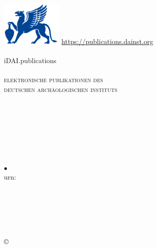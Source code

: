 \documentclass[fontsize=9pt,english,ngerman]{scrartcl}
\def\issnonlinetag{\issntagonline \mysep \eng{\issntagonline} \mybf{\issnonline}\\}
\begin{document}
\begin{flushright}
\includegraphics[width=3cm]{dailogo}\hspace*{1.9cm}%
{\tiny\href{https://publications.dainst.org}{https://publications.dainst.org}}\\[-.2em]
\myrule\\[.5em]
{\fontsize{30}{10}\selectfont iDAI.publications}\\
\myrule\\[.5em]
{\scshape elektronische publikationen des\\ deutschen archäologischen instituts}
\end{flushright}
\RaggedRight
\vspace*{4em}
\entry{\digitaloffprint}{}\\[1em]
{\huge\artauthor\\[.5em]
\mybf{\arttitle}}{}\\[6em]

\entry{\from}{}

{\huge\mybf{\journal}\\
\journalsubtitle\\[3em]}

\entry{\issuetag}{\issue} {$\bullet$} \mybf{\yearpub}\hfill\purl\\
\entry{\pagestag}{\pages}\hfill urn: \urn\\[1em]
\vfill
\begin{footnotesize}
\entry{\editortag}{\editor}\\
\entry{\journalurltag}{\journalurl}\\
\entry{\issntag}{\issn}\\
\issnonlinetag
\entry{\publishertag}{\publisher}\\[1em]

\copyright\,\the\year{} \copyrightdai\\[1em]
\terms\\[1em]
\eng{\terms}\\
\end{footnotesize}
\end{document}
